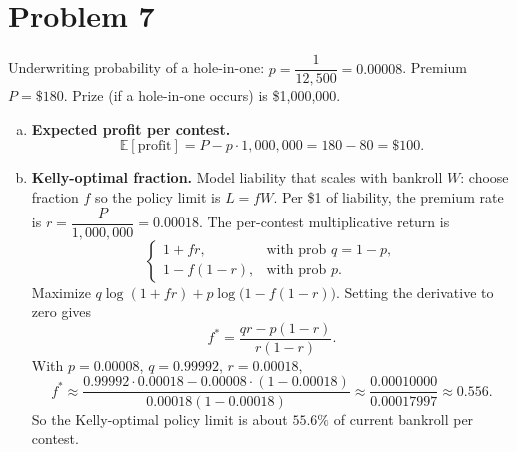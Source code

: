 \section*{Problem 7}

Underwriting probability of a hole-in-one: $p=\dfrac{1}{12{,}500}=0.00008$.  
Premium $P=\$180$. Prize (if a hole-in-one occurs) is \$1{,}000{,}000.

\begin{enumerate}[(a)]
\item \textbf{Expected profit per contest.}
\[
\mathbb{E}[\text{profit}]
= P - p\cdot 1{,}000{,}000
= 180 - 80
= \boxed{\$100}.
\]

\item \textbf{Kelly-optimal fraction.}
Model liability that scales with bankroll $W$: choose fraction $f$ so the policy limit is $L=fW$.
Per \$1 of liability, the premium rate is $r=\dfrac{P}{1{,}000{,}000}=0.00018$.
The per-contest multiplicative return is
\[
\begin{cases}
1+fr, & \text{with prob } q=1-p,\\
1-f(1-r), & \text{with prob } p.
\end{cases}
\]
Maximize $q\log(1+fr)+p\log\big(1-f(1-r)\big)$. Setting the derivative to zero gives
\[
f^*=\frac{qr - p(1-r)}{r(1-r)}.
\]
With $p=0.00008$, $q=0.99992$, $r=0.00018$,
\[
f^* \approx \frac{0.99992\cdot 0.00018 - 0.00008\cdot(1-0.00018)}
{0.00018(1-0.00018)}
\approx \frac{0.00010000}{0.00017997}
\approx \boxed{0.556}.
\]
So the Kelly-optimal policy limit is about $55.6\%$ of current bankroll per contest.
\end{enumerate}
